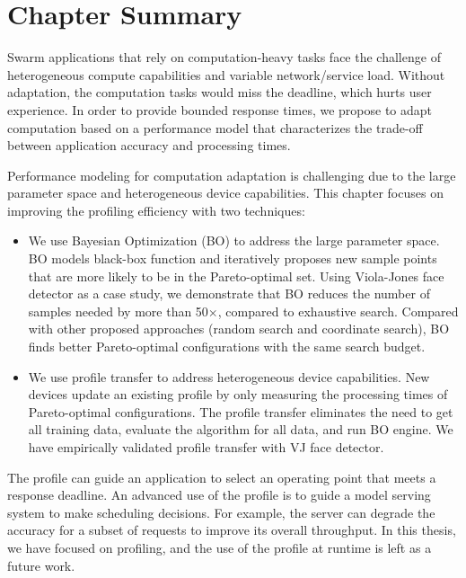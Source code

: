 \section{Chapter Summary}
\label{sec:chap-summary}

Swarm applications that rely on computation-heavy tasks face the challenge of
heterogeneous compute capabilities and variable network/service load. Without
adaptation, the computation tasks would miss the deadline, which hurts user
experience. In order to provide bounded response times, we propose to adapt
computation based on a performance model that characterizes the trade-off
between application accuracy and processing times.

Performance modeling for computation adaptation is challenging due to the large
parameter space and heterogeneous device capabilities. This chapter focuses on
improving the profiling efficiency with two techniques:

\begin{itemize}[topsep=5pt, itemsep=5pt]
\item We use Bayesian Optimization (BO) to address the large parameter space. BO
  models black-box function and iteratively proposes new sample points that are
  more likely to be in the Pareto-optimal set. Using Viola-Jones face detector
  as a case study, we demonstrate that BO reduces the number of samples needed
  by more than 50$\times$, compared to exhaustive search. Compared with other
  proposed approaches (random search and coordinate search), BO finds better
  Pareto-optimal configurations with the same search budget.
\item We use profile transfer to address heterogeneous device capabilities. New
  devices update an existing profile by only measuring the processing times of
  Pareto-optimal configurations. The profile transfer eliminates the need to get
  all training data, evaluate the algorithm for all data, and run BO engine. We
  have empirically validated profile transfer with VJ face detector.
\end{itemize}

The profile can guide an application to select an operating point that meets a
response deadline. An advanced use of the profile is to guide a model serving
system to make scheduling decisions. For example, the server can degrade the
accuracy for a subset of requests to improve its overall throughput. In this
thesis, we have focused on profiling, and the use of the profile at runtime is
left as a future work.

